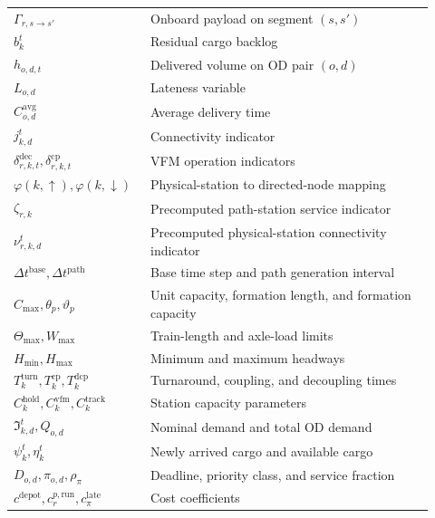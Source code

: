 \documentclass[11pt]{article}
\begin{document}
\begin{longtable}{p{0.28\linewidth}p{0.64\linewidth}}
$\Gamma_{r,s\to s'}$ & Onboard payload on segment $(s,s')$ \\
$b_k^{t}$ & Residual cargo backlog \\
$h_{o,d,t}$ & Delivered volume on OD pair $(o,d)$ \\
$L_{o,d}$ & Lateness variable \\
$C_{o,d}^{\mathrm{avg}}$ & Average delivery time \\
$j_{k,d}^{t}$ & Connectivity indicator \\
$\delta_{r,k,t}^{\mathrm{dec}}, \delta_{r,k,t}^{\mathrm{cp}}$ & VFM operation indicators \\
$\varphi(k,\uparrow), \varphi(k,\downarrow)$ & Physical-station to directed-node mapping \\
$\zeta_{r,k}$ & Precomputed path-station service indicator \\
$\nu_{r,k,d}^{t}$ & Precomputed physical-station connectivity indicator \\
$\Delta t^{\mathrm{base}}, \Delta t^{\mathrm{path}}$ & Base time step and path generation interval \\
$C_{\max}, \theta_p, \vartheta_p$ & Unit capacity, formation length, and formation capacity \\
$\Theta_{\max}, W_{\max}$ & Train-length and axle-load limits \\
$H_{\min}, H_{\max}$ & Minimum and maximum headways \\
$T_k^{\mathrm{turn}}, T_k^{\mathrm{cp}}, T_k^{\mathrm{dcp}}$ & Turnaround, coupling, and decoupling times \\
$C_k^{\mathrm{hold}}, C_k^{\mathrm{vfm}}, C_k^{\mathrm{track}}$ & Station capacity parameters \\
$\Im_{k,d}^{t}, Q_{o,d}$ & Nominal demand and total OD demand \\
$\psi_k^{t}, \eta_k^{t}$ & Newly arrived cargo and available cargo \\
$D_{o,d}, \pi_{o,d}, \rho_{\pi}$ & Deadline, priority class, and service fraction \\
$c^{\mathrm{depot}}, c_{r}^{p,\mathrm{run}}, c_{\pi}^{\mathrm{late}}$ & Cost coefficients \\
\bottomrule
\end{longtable}
\end{document}
